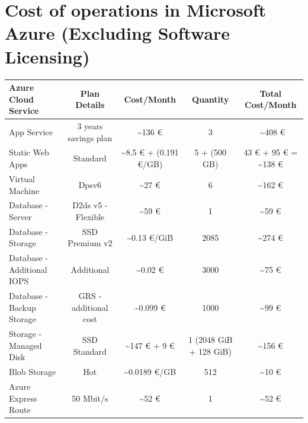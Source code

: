 \documentclass{llncs}
\begin{document}
\section{Cost of operations in Microsoft Azure (Excluding Software Licensing) \cite{azurepricingcalculator}}
\begin{table}[htbp]
    \centering
    \begin{tabular}{|l|c|c|c|c|}
        \hline
        \textbf{Azure Cloud Service} & \textbf{Plan Details} & \textbf{Cost/Month}                  & \textbf{Quantity} & \textbf{Total Cost/Month}           \\

        \hline
 App Service                  & 3 years savings plan  & \textasciitilde 136 €                & 3                 & ~\textasciitilde 408 €              \\
        \hline
 Static Web Apps              & Standard              & \textasciitilde 8.5 € + (0.191 €/GB) & 5 + (500 GB)      & 43 € + 95 € = \textasciitilde 138 € \\
        \hline
 Virtual Machine              & Dpsv6                 & \textasciitilde 27 €                 & 6                 & \textasciitilde 162 €               \\
        \hline
 Database - Server            & D2ds v5 - Flexible    & \textasciitilde 59 €                 & 1                 & \textasciitilde 59 €                \\
        \hline
 Database - Storage           & SSD Premium v2        & \textasciitilde 0.13 €/GiB           & 2085              & \textasciitilde 274 €               \\
        \hline
 Database - Additional IOPS   & Additional            & \textasciitilde 0.02 €               & 3000              & \textasciitilde 75 €                \\
        \hline
 Database - Backup Storage    & GRS - additional cost & \textasciitilde 0.099 €              & 1000              & \textasciitilde 99 €                \\
        \hline
 Storage - Managed Disk       & SSD Standard          & \textasciitilde 147 € + 9 €          & 1 (2048 GiB + 128 GiB) & \textasciitilde 156 €               \\
        \hline
 Blob Storage                 & Hot                   & \textasciitilde 0.0189 €/GB          & 512               & \textasciitilde 10 €                \\
        \hline
 Azure Express Route          & 50 Mbit/s             & \textasciitilde 52 €                 & 1                 & \textasciitilde 52 €                \\

\end{tabular}
\end{table}
\end{document}
